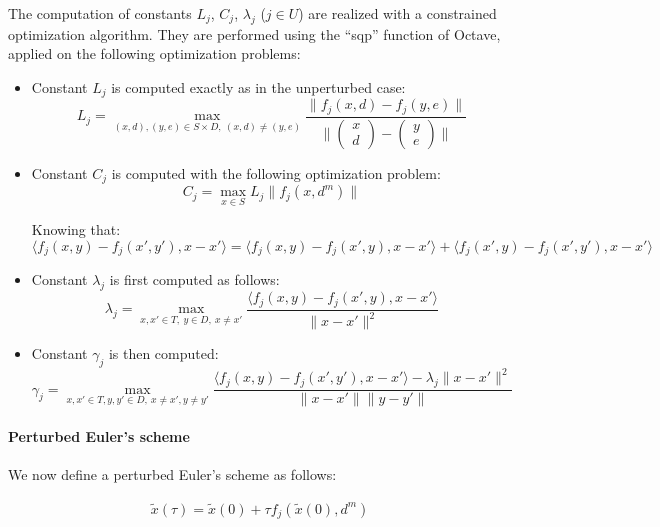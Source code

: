 The computation of constants $L_j$, $C_j$, $\lambda_j$ 
($j\in U$) are realized with
a constrained optimization algorithm.
They are performed using the ``sqp'' function of Octave, applied on the following 
optimization problems:
\begin{itemize}
 \item Constant $L_j$ is computed exactly as in the unperturbed case:
 $$ L_j = \max_{{(x,d),(y,e)}\in S\times D,\  (x,d)\neq (y,e)} \frac{\| f_j(x,d) - f_j(y,e) \|}{\|\begin{pmatrix} x \\ d \end{pmatrix} - \begin{pmatrix} y \\ e \end{pmatrix} \|}  $$
 \item Constant $C_j$ is computed with the following optimization problem:
 $$ C_j = \max_{{x}\in S} L_j \| f_j(x,d^m) \|$$
 
 Knowing that: 
 $$ \langle f_j (x,y) - f_j (x',y'), x - x' \rangle =  \langle f_j (x,y) - f_j (x',y), x - x' \rangle + \langle f_j (x',y) - f_j (x',y'), x - x' \rangle$$
 
 \item Constant $\lambda_j$ is first computed as follows:
 $$ \lambda_j = \max_{{x,x'}\in T,\ y \in D,\  x\neq x'} \frac{\langle f_j(x,y) - f_j(x',y), x - x' \rangle}{\|x - x' \|^2 }$$
 \item Constant $\gamma_j$ is then computed:
  $$ \gamma_j = \max_{{x,x'}\in T, y,y' \in D,\  x\neq x' , y \neq y'} \frac{\langle f_j(x,y) - f_j(x',y'), x - x' \rangle - \lambda_j \| x - x' \|^2}{\|x - x' \|\|y-y'\| }$$
 \end{itemize}

 


\paragraph{Perturbed Euler's scheme}
 
We now define a perturbed Euler's scheme as follows:

\begin{eqnarray}
 \tilde x(\tau) = \tilde x(0) + \tau f_{j}(\tilde x(0),d^m)
\end{eqnarray}


